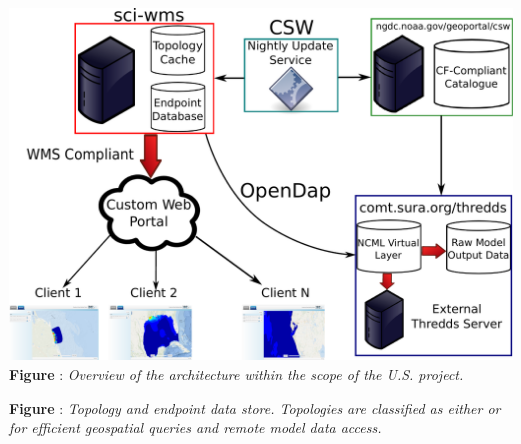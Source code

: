 \documentclass[noback,noborder,portrait,twocolumn]{cuposter}
\begin{document}


\begin{minipage}[t]{0.49\linewidth}
  \centering
  \includegraphics[width=\linewidth]{../figs/overview.pdf}
  \captionspace{}
  \textbf{Figure \getIncFigcounter{}}: \textit{Overview of the \sciwms{} architecture within the scope of the U.S. \ioos{} \comt{} project.}
\end{minipage}
\begin{minipage}[t]{0.49\linewidth}
  \centering
  \textbf{Figure \getIncFigcounter{}}: \textit{Topology and endpoint data store. Topologies are classified as either \cgrid{} or \ugrid{} for efficient geospatial queries and remote model data access.}
\end{minipage}
\end{document}
